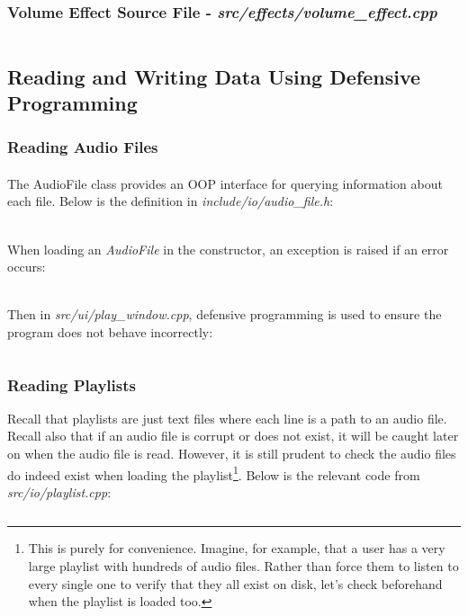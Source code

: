 \subsubsection{Volume Effect Source File - \textit{src/effects/volume\_effect.cpp}}
\inputminted[linenos]{c++}{../src/effects/volume_effect.cpp}


\pagebreak
\subsection{Reading and Writing Data Using Defensive Programming}

\subsubsection{Reading Audio Files}
\paragraph{}
The AudioFile class provides an OOP interface for querying information about each file. Below is the definition in \textit{include/io/audio\_file.h}:
\inputminted[linenos]{c++}{../include/io/audio_file.h}

\paragraph{}
When loading an \textit{AudioFile} in the constructor, an exception is raised if an error occurs:
\inputminted[linenos, firstline=4, lastline=10]{c++}{../src/io/audio_file.cpp}

\paragraph{}
Then in \textit{src/ui/play\_window.cpp},  defensive programming is used to ensure the program does not behave incorrectly:
\pagebreak
\inputminted[linenos, firstline=303, lastline=348]{c++}{../src/ui/play_window.cpp}

\pagebreak
\subsubsection{Reading Playlists}
Recall that playlists are just text files where each line is a path to an audio file. Recall also that if an audio file is corrupt or does not exist, it will be caught later on when the audio file is read. However, it is still prudent to check the audio files do indeed exist when loading the playlist\footnote{
	This is purely for convenience. Imagine, for example, that a user has a very large playlist with hundreds of audio files. Rather than force them to listen to every single one to verify that they all exist on disk, let's check beforehand when the playlist is loaded too.
}. Below is the relevant code from \textit{src/io/playlist.cpp}:
\inputminted[linenos, firstline=25, lastline=55]{c++}{../src/io/playlist.cpp}

